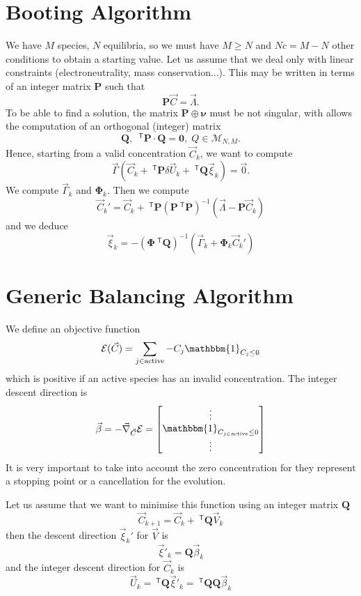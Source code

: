 \documentclass[aps]{revtex4}
\newcommand{\mymat}[1]{\bm{#1}}
\newcommand{\mytrn}[1]{~^{\mathsf{T}}{#1}}
\begin{document}
\section{Booting Algorithm}
We have $M$ species, $N$ equilibria, 
so we must have $M\geq N$ and $Nc=M-N$ other conditions
to obtain a starting value.
Let us assume that we deal only with linear constraints (electroneutrality, mass conservation...).
This may be written in terms of an integer matrix $\mymat{P}$
such that
$$
	\mymat{P}\vec{C} = \vec{\Lambda}.
$$
To be able to find a solution, the matrix $\mymat{P}\oplus\mymat{\nu}$ must
be not singular, with allows the computation of an orthogonal (integer) matrix
$$
	\mymat{Q},\;\mytrn{\mymat{P}}\cdot\mymat{Q} = \mymat{0},\;Q\in\mathcal{M}_{N,M}.
$$
Hence, starting from a valid concentration $\vec{C}_k$, we want to compute
$$
	\vec{\Gamma}
	\left(
		\vec{C}_k+\mytrn{\mymat{P}}\delta\vec{U}_k + \mytrn{\mymat{Q}}\vec{\xi}_k
		\right) = \vec{0}.
$$
We compute $\vec{\Gamma}_k$ and $\mymat{\Phi}_k$. Then we
compute
$$
	\vec{C}_k' = \vec{C}_k + \mytrn{\mymat{P}}\left(\mymat{P}\mytrn{\mymat{P}}\right)^{-1}\left(\vec{\Lambda}-\mymat{P}\vec{C}_k\right)
$$
and we deduce
$$
	\vec{\xi}_k = -\left(\mymat{\Phi}\mytrn{\mymat{Q}}\right)^{-1}\left(\vec{\Gamma}_k+\mymat{\Phi}_k \vec{C}_k'\right)
$$

\section{Generic Balancing Algorithm}
We define an objective function
$$
	\mathcal{E}(\vec{C}) = \sum_{j\in\mathrm{active}} -C_j \mathbbm{1}_{C_j\leq0}
$$
which is positive if an active species has an invalid concentration.
The integer descent direction is
$$
	\vec{\beta} = - \vec{\nabla}_{\vec{C}} \mathcal{E} = 
	\begin{bmatrix}
		\vdots\\
		\mathbbm{1}_{C_{j\in\mathrm{active}}\leq0}\\
		\vdots
	\end{bmatrix}
$$
It is very important to take into account the zero concentration for they
represent a stopping point or a cancellation for the evolution.

Let us assume that we want to minimise this function using an integer matrix $\mymat{Q}$
$$
	\vec{C}_{k+1} = \vec{C}_k + \mytrn{\mymat{Q}}\vec{V}_k
$$
then the descent direction $\vec{\xi}_k'$ for $\vec{V}$ is
$$
		\vec{\xi}'_k = \mymat{Q} \vec{\beta}_k
$$
and the integer descent direction for $\vec{C}_k$ is
$$
	\vec{U}_k = \mytrn{\mymat{Q}} \vec{\xi}'_k = \mytrn{\mymat{Q}} \mymat{Q} \vec{\beta}_k
$$
\end{document}
